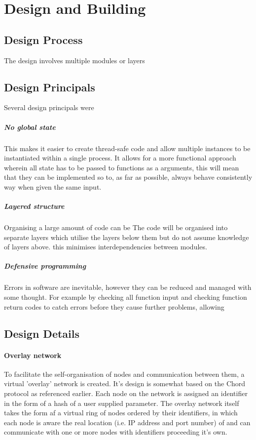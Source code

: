 \documentclass{article}
\begin{document}
\section{Design and Building}

\subsection{Design Process}

The design involves multiple modules or layers

\subsection{Design Principals}
Several design principals were

\subparagraph{No global state}
This makes it easier to create thread-safe code and allow multiple instances to be instantiated within a single process. It allows for a more functional approach wherein all state has to be passed to functions as a arguments, this will mean that they can be implemented so to, as far as possible, always behave consistently way when given the same input.

\subparagraph{Layered structure}
Organising a large amount of code can be
The code will be organised into separate layers which utilise the layers below them but do not assume knowledge of layers above. this minimises interdependencies between modules.

\subparagraph{Defensive programming}
Errors in software are inevitable, however they can be reduced and managed with some thought. For example by checking all function input and checking function return codes to catch errors before they cause further problems, allowing

\subsection{Design Details}

\paragraph{Overlay network}
To facilitate the self-organisation of nodes and communication between them, a virtual 'overlay' network is created. It's design is somewhat based on the Chord protocol as referenced earlier. Each node on the network is assigned an identifier in the form of a hash of a user supplied parameter. The overlay network itself takes the form af a virtual ring of nodes ordered by their identifiers, in which each node is aware the real location (i.e. IP address and port number) of and can communicate with one or more nodes with identifiers proceeding it's own.
\end{document}
